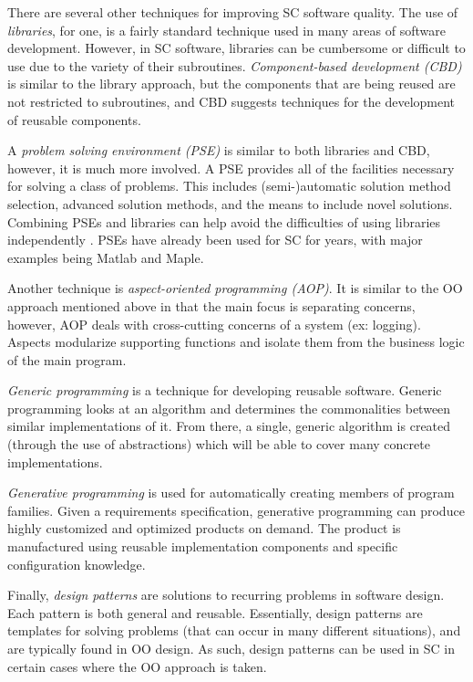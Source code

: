 \documentclass[10pt, preprint]{sigplanconf}
\begin{document}
There are several other techniques for improving SC software quality. The use of \textit{libraries}, for one, is a fairly standard technique used in many areas of software development. However, in SC software, libraries can be cumbersome or difficult to use due to the variety of their subroutines. \textit{Component-based development (CBD)} is similar to the library approach, but the components that are being reused are not restricted to subroutines, and CBD suggests techniques for the development of reusable components.

A \textit{problem solving environment (PSE)} is similar to both libraries and CBD, however, it is much more involved. A PSE provides all of the facilities necessary for solving a class of problems. This includes (semi-)automatic solution method selection, advanced solution methods, and the means to include novel solutions. Combining PSEs and libraries can help avoid the difficulties of using libraries independently \cite{RiceBoisvert1996}. PSEs have already been used for SC for years, with major examples being Matlab and Maple.

Another technique is \textit{aspect-oriented programming (AOP)}. It is similar to the OO approach mentioned above in that the main focus is separating concerns, however, AOP deals with cross-cutting concerns of a system (ex: logging). Aspects modularize supporting functions and isolate them from the business logic of the main program.

\textit{Generic programming} is a technique for developing reusable software. Generic programming looks at an algorithm and determines the commonalities between similar implementations of it. From there, a single, generic algorithm is created (through the use of abstractions) which will be able to cover many concrete implementations.

\textit{Generative programming} is used for automatically creating members of program families. Given a requirements specification, generative programming can produce highly customized and optimized products on demand. The product is manufactured using reusable implementation components and specific configuration knowledge.

Finally, \textit{design patterns} are solutions to recurring problems in software design. Each pattern is both general and reusable. Essentially, design patterns are templates for solving problems (that can occur in many different situations), and are typically found in OO design. As such, design patterns can be used in SC in certain cases where the OO approach is taken.
\end{document}
